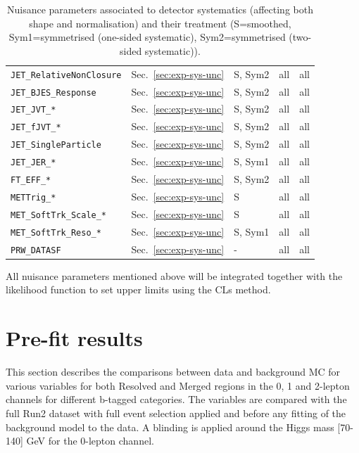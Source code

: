 \begin{table}[ht]
\begin{tabular}{|p{3.5cm}|p{2.0cm}|p{1.5cm}|p{2cm}|p{1.5cm}|}
        \texttt{JET\_RelativeNonClosure} & Sec.~\ref{sec:exp-sys-unc} & S, Sym2 & all & all \\
        \texttt{JET\_BJES\_Response} & Sec.~\ref{sec:exp-sys-unc} & S, Sym2 & all & all \\
        \texttt{JET\_JVT\_*} & Sec.~\ref{sec:exp-sys-unc} & S, Sym2 & all & all \\
        \texttt{JET\_fJVT\_*} & Sec.~\ref{sec:exp-sys-unc} & S, Sym2 & all & all \\
        \texttt{JET\_SingleParticle} & Sec.~\ref{sec:exp-sys-unc} & S, Sym2 & all & all \\
        \texttt{JET\_JER\_*} & Sec.~\ref{sec:exp-sys-unc} & S, Sym1 & all & all \\
        \texttt{FT\_EFF\_*} & Sec.~\ref{sec:exp-sys-unc} & S, Sym2 & all & all \\
        \texttt{METTrig\_*} & Sec.~\ref{sec:exp-sys-unc} & S & all & all \\
        \texttt{MET\_SoftTrk\_Scale\_*} & Sec.~\ref{sec:exp-sys-unc} & S & all & all \\
        \texttt{MET\_SoftTrk\_Reso\_*} & Sec.~\ref{sec:exp-sys-unc} & S, Sym1 & all & all \\
        \texttt{PRW\_DATASF} & Sec.~\ref{sec:exp-sys-unc} & - & all & all \\
        \hline
    \end{tabular}
    \caption{Nuisance parameters associated to detector systematics (affecting both shape and normalisation) and their treatment (S=smoothed, Sym1=symmetrised (one-sided systematic), Sym2=symmetrised (two-sided systematic)).}
    \label{tab:np-shape2}
\end{table}  

\par All nuisance parameters mentioned above will be integrated together with the likelihood function to set upper limits using the CLs method.

\section{Pre-fit results}

\par This section describes the comparisons between data and background MC for various variables for both
Resolved and Merged regions in the 0, 1 and 2-lepton channels for different b-tagged categories. The variables are
compared with the full Run2 dataset with full event selection applied and before any fitting of the background
model to the data. A blinding is applied around the Higgs mass [70-140] GeV for the 0-lepton channel.

